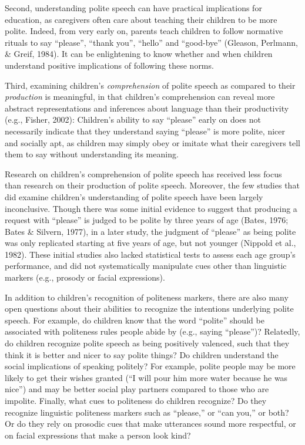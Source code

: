 \documentclass[10pt, letterpaper]{article}
\begin{document}
Second, understanding polite speech can have practical implications for
education, as caregivers often care about teaching their children to be
more polite. Indeed, from very early on, parents teach children to
follow normative rituals to say ``please'', ``thank you'', ``hello'' and
``good-bye'' (Gleason, Perlmann, \& Greif, 1984). It can be enlightening
to know whether and when children understand positive implications of
following these norms.

Third, examining children's \emph{comprehension} of polite speech as
compared to their \emph{production} is meaningful, in that children's
comprehension can reveal more abstract representations and inferences
about language than their productivity (e.g., Fisher, 2002): Children's
ability to say ``please'' early on does not necessarily indicate that
they understand saying ``please'' is more polite, nicer and socially
apt, as children may simply obey or imitate what their caregivers tell
them to say without understanding its meaning.

Research on children's comprehension of polite speech has received less
focus than research on their production of polite speech. Moreover, the
few studies that did examine children's understanding of polite speech
have been largely inconclusive. Though there was some initial evidence
to suggest that producing a request with ``please'' is judged to be
polite by three years of age (Bates, 1976; Bates \& Silvern, 1977), in a
later study, the judgment of ``please'' as being polite was only
replicated starting at five years of age, but not younger (Nippold et
al., 1982). These initial studies also lacked statistical tests to
assess each age group's performance, and did not systematically
manipulate cues other than linguistic markers (e.g., prosody or facial
expressions).

In addition to children's recognition of politeness markers, there are
also many open questions about their abilities to recognize the
intentions underlying polite speech. For example, do children know that
the word ``polite'' should be associated with politeness rules people
abide by (e.g., saying ``please'')? Relatedly, do children recognize
polite speech as being positively valenced, such that they think it is
better and nicer to say polite things? Do children understand the social
implications of speaking politely? For example, polite people may be
more likely to get their wishes granted (``I will pour him more water
because he was nice'') and may be better social play partners compared
to those who are impolite. Finally, what cues to politeness do children
recognize? Do they recognize linguistic politeness markers such as
``please,'' or ``can you,'' or both? Or do they rely on prosodic cues
that make utterances sound more respectful, or on facial expressions
that make a person look kind?
\end{document}
